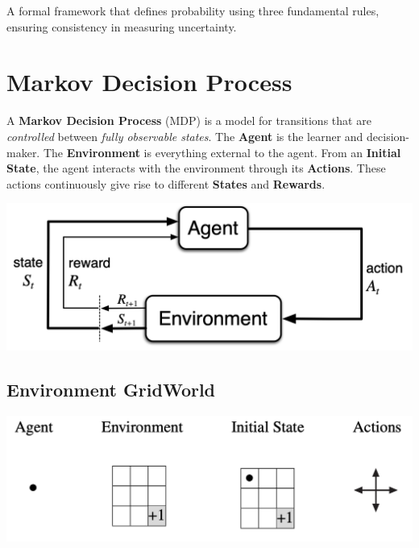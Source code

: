 \documentclass[
  letterpaper,
  DIV=11,
  numbers=noendperiod]{scrreprt}
\begin{document}
\begin{tcolorbox}[enhanced jigsaw, colback=white, left=2mm, breakable, opacityback=0, bottomrule=.15mm, rightrule=.15mm, arc=.35mm, colframe=quarto-callout-note-color-frame, leftrule=.75mm, toprule=.15mm]

A formal framework that defines probability using three fundamental
rules, ensuring consistency in measuring uncertainty. 🎲

\end{tcolorbox}

\section{Markov Decision Process}\label{markov-decision-process}

A \textbf{Markov Decision Process} (MDP) is a model for transitions that
are \emph{controlled} between \emph{fully observable states}. The
\textbf{Agent} is the learner and decision-maker. The
\textbf{Environment} is everything external to the agent. From an
\textbf{Initial State}, the agent interacts with the environment through
its \textbf{Actions}. These actions continuously give rise to different
\textbf{States} and \textbf{Rewards}.

\begin{center}
\includegraphics[width=0.75\linewidth,height=\textheight,keepaspectratio]{lecture4/images/MDP.png}
\end{center}

\subsection{Environment GridWorld}\label{environment-gridworld}

\begin{center}
\includegraphics[width=0.65\linewidth,height=\textheight,keepaspectratio]{lecture4/images/MDPGridworld-ex.png}
\end{center}
\end{document}
